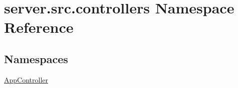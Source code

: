 \hypertarget{namespaceserver_1_1src_1_1controllers}{}\section{server.\+src.\+controllers Namespace Reference}
\label{namespaceserver_1_1src_1_1controllers}
\subsection*{Namespaces}
\begin{DoxyCompactItemize}
\item 
 \hyperlink{namespaceserver_1_1src_1_1controllers_1_1_app_controller}{App\+Controller}
\end{DoxyCompactItemize}
